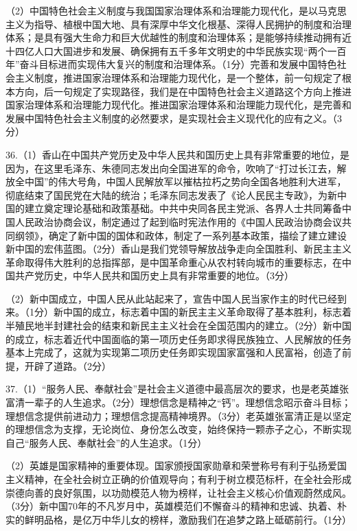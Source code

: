 \documentclass[UTF8,11pt]{ctexart}
\begin{document}
（2）中国特色社会主义制度与我国国家治理体系和治理能力现代化，是以马克思主义为指导、植根中国大地、具有深厚中华文化根基、深得人民拥护的制度和治理体系；是具有强大生命力和巨大优越性的制度和治理体系；是能够持续推动拥有近十四亿人口大国进步和发展、确保拥有五千多年文明史的中华民族实现“两个一百年”奋斗目标进而实现伟大复兴的制度和治理体系。（1分）完善和发展中国特色社会主义制度，推进国家治理体系和治理能力现代化，是一个整体，前一句规定了根本方向，后一句规定了实现路径，我们是在中国特色社会主义道路这个方向上推进国家治理体系和治理能力现代化。推进国家治理体系和治理能力现代化，是完善和发展中国特色社会主义制度的必然要求，是实现社会主义现代化的应有之义。（3分）


36.（1）香山在中国共产党历史及中华人民共和国历史上具有非常重要的地位，是因为，在这里毛泽东、朱德同志发出向全国进军的命令，吹响了“打过长江去，解放全中国”的伟大号角，中国人民解放军以摧枯拉朽之势向全国各地胜利大进军，彻底结束了国民党在大陆的统治；毛泽东同志发表了《论人民民主专政》，为新中国的建立奠定理论基础和政策基础。中共中央同各民主党派、各界人士共同筹备中国人民政治协商会议，制定通过了起到临时宪法作用的《中国人民政治协商会议共同纲领》，确定了新中国的国体和政体，制定了一系列基本政策，描绘了建立建设新中国的宏伟蓝图。（2分）香山是我们党领导解放战争走向全国胜利、新民主主义革命取得伟大胜利的总指挥部，是中国革命重心从农村转向城市的重要标志，在中国共产党历史，中华人民共和国历史上具有非常重要的地位。（3分）


（2）新中国成立，中国人民从此站起来了，宣告中国人民当家作主的时代已经到来。（1分）新中国的成立，标志着中国的新民主主义革命取得了基本胜利，标志着半殖民地半封建社会的结束和新民主主义社会在全国范围内的建立。（2分）新中国的成立，标志着近代中国面临的第一项历史任务即求得民族独立、人民解放的任务基本上完成了，这就为实现第二项历史任务即实现国家富强和人民富裕，创造了前提，开辟了道路。（2分）


37.（1）“服务人民、奉献社会”是社会主义道德中最高层次的要求，也是老英雄张富清一辈子的人生追求。（2分）理想信念是精神之“钙”。理想信念昭示奋斗目标；理想信念提供前进动力；理想信念提高精神境界。（3分）老英雄张富清正是以坚定的理想信念为支撑，无论岗位、身份怎么改变，始终保持一颗赤子之心，不断实现自己“服务人民、奉献社会”的人生追求。（1分）


（2）英雄是国家精神的重要体现。国家颁授国家勋章和荣誉称号有利于弘扬爱国主义精神，在全社会树立正确的价值观导向；有利于树立模范标杆，在全社会形成崇德向善的良好氛围，以功勋模范人物为榜样，让社会主义核心价值观蔚然成风。（3分）新中国70年的不凡岁月中，英雄模范们不懈奋斗的精神和忠诚、执着、朴实的鲜明品格，是亿万中华儿女的榜样，激励我们在追梦之路上砥砺前行。（1分）
\end{document}
